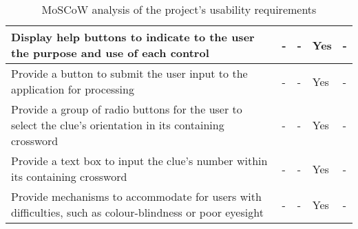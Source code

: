 \begin{table}[H]
\begin{tabular}{|p{9.3cm}|p{1.3cm}|p{1.3cm}|p{1.3cm}|p{1.3cm}|}
    Display help buttons to indicate to the user the purpose and use of each control &
    - & - & Yes & - \\ \hline

    Provide a button to submit the user input to the application for processing &
	- & - & Yes & - \\ \hline

	Provide a group of radio buttons for the user to select the clue's orientation in its containing crossword &
	- & - & Yes & - \\ \hline

    Provide a text box to input the clue's number within its containing crossword &
	- & - & Yes & - \\ \hline

	Provide mechanisms to accommodate for users with difficulties, such as colour-blindness or poor eyesight &
	- & - & Yes & - \\ \hline

    \end{tabular}
    \caption {MoSCoW analysis of the project's usability requirements}
\end{table}